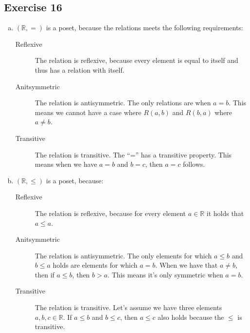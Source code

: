 \documentclass[a4paper]{article}
\newcommand{\exerciseenum}[2]{\subsection*{Exercise #1}{\begin{enumerate}[a)]#2\end{enumerate}}}
\newcommand{\RR}{\ensuremath{\mathbb{R}}}
\begin{document}
\exerciseenum{16}{%
\item%
$(\RR,=)$
is a poset, because the relations meets the following requirements:
\begin{description}
\item[Reflexive]
The relation is reflexive, because every element is equal to itself and thus has a relation with itself.
\item[Anitsymmetric]
The relation is antisymmetric.
The only relations are when $a = b$. This means we cannot have a case where $R(a,b)$ and $R(b, a)$ where $a \neq b$.

\item[Transitive]
The relation is transitive.
The \enquote{=} has a transitive property. This means when we have $a = b$ and $b = c$, then $a = c$ follows.

\end{description}

\addtocounter{enumi}{1}
\item%
$(\RR,\leq)$
is a poset, because:
\begin{description}
\item[Reflexive]
The relation is reflexive, because for every element $a \in \RR$ it holds that $a \leq a$.
\item[Anitsymmetric]
The relation is antisymmetric.
The only elements for which $a \leq b$ and $b \leq a$ holds are elements for which $a = b$. When we have that $a \neq b$, then if $a \leq b$, then $b > a$. This means it's only symmetric when $a = b$.

\item[Transitive]
The relation is transitive.
Let's assume we have three elements $a, b, c \in \RR$. If $a \leq b$ and $b \leq c$, then $a \leq c$ also holds because the $\leq$ is transitive.

\end{description}
}
\end{document}
